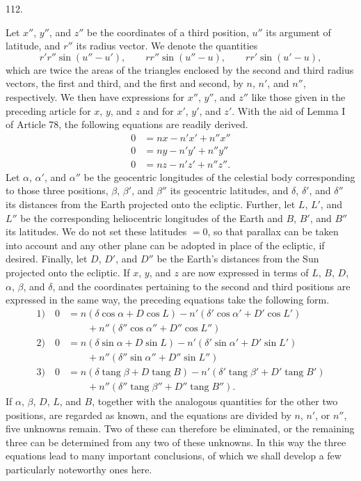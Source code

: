 \par{}\medskip
{}
\begin{center}112.\end{center}
Let $x''$, $y''$, and $z''$ be the coordinates of a third position, $u''$ its argument of latitude, and $r''$ its radius vector. We denote the quantities
\[
r'r''\sin(u''-u'),\qquad rr''\sin(u''-u),\qquad rr'\sin(u'-u),
\]
which are twice the areas of the triangles enclosed by the second and third radius vectors, the first and third, and the first and second, by $n$, $n'$, and $n''$, respectively. We then have expressions for $x''$, $y''$, and $z''$ like those given in the preceding article for $x$, $y$, and $z$ and for $x'$, $y'$, and $z'$. With the aid of Lemma I of Article 78, the following equations are readily derived.
\[
\begin{aligned}
0&=nx-n'x'+n''x''\\
0&=ny-n'y'+n''y''\\
0&=nz-n'z'+n''z''.
\end{aligned}
\]
Let $\alpha$, $\alpha'$, and $\alpha''$ be the geocentric longitudes of the celestial body corresponding to those three positions, $\beta$, $\beta'$, and $\beta''$ its geocentric latitudes, and $\delta$, $\delta'$, and $\delta''$ its distances from the Earth projected onto the ecliptic. Further, let $L$, $L'$, and $L''$ be the corresponding heliocentric longitudes of the Earth and $B$, $B'$, and $B''$ its latitudes. We do not set these latitudes $=0$, so that parallax can be taken into account and any other plane can be adopted in place of the ecliptic, if desired. Finally, let $D$, $D'$, and $D''$ be the Earth's distances from the Sun projected onto the ecliptic. If $x$, $y$, and $z$ are now expressed in terms of $L$, $B$, $D$, $\alpha$, $\beta$, and $\delta$, and the coordinates pertaining to the second and third positions are expressed in the same way, the preceding equations take the following form.
\[
\begin{aligned}
1)\quad 0&=n(\delta\cos\alpha+D\cos L)-n'(\delta'\cos\alpha'+D'\cos L')\\
&\qquad+n''(\delta''\cos\alpha''+D''\cos L'')\\[.5ex]
2)\quad 0&=n(\delta\sin\alpha+D\sin L)-n'(\delta'\sin\alpha'+D'\sin L')\\
&\qquad+n''(\delta''\sin\alpha''+D''\sin L'')\\[.5ex]
3)\quad 0&=n(\delta\operatorname{tang}\beta+D\operatorname{tang}B)-n'(\delta'\operatorname{tang}\beta'+D'\operatorname{tang}B')\\
&\qquad+n''(\delta''\operatorname{tang}\beta''+D''\operatorname{tang}B'').
\end{aligned}
\]
If $\alpha$, $\beta$, $D$, $L$, and $B$, together with the analogous quantities for the other two positions, are regarded as known, and the equations are divided by $n$, $n'$, or $n''$, five unknowns remain. Two of these can therefore be eliminated, or the remaining three can be determined from any two of these unknowns. In this way the three equations lead to many important conclusions, of which we shall develop a few particularly noteworthy ones here.
